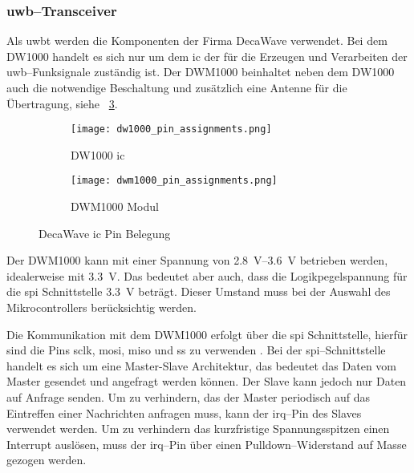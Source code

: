 \begin{comment}
------------------------------------------------------------------------------------------
TODO: Wie wird der Vorwiderstand berechnet? ca. 10mA bei 1.8V, R=(U_0-U_LED)/I_LED

LED Vorwiderstand berechnen
	- https://www.youtube.com/watch?v=iNZj91TSRUg
	- DW1000 Datasheet - 5.9 General Purpose Input Output (GPIO)
\end{comment}
\subsubsection{\gls{uwb}--Transceiver}\label{subsec:uwb_transceiver}

Als \gls{uwbt} werden die Komponenten der Firma DecaWave verwendet. Bei dem DW1000 handelt es sich nur um dem \gls{ic} der für die Erzeugen und Verarbeiten der \gls{uwb}--Funksignale zuständig ist. Der DWM1000 beinhaltet neben dem DW1000 auch die notwendige Beschaltung und zusätzlich eine Antenne für die Übertragung, siehe \figurename~\ref{fig:pin_assignment}.

\begin{figure}
	\begin{subfigure}[t]{0.4\textwidth}
		\texttt{[image: dw1000\_pin\_assignments.png]}
		\caption{DW1000 \gls{ic}}
		\label{fig:dw1000_pin_assignments}
	\end{subfigure}
	\hfill
	\begin{subfigure}[t]{0.4\textwidth}
		\texttt{[image: dwm1000\_pin\_assignments.png]}
		\caption{DWM1000 Modul}
		\label{fig:dwm1000_pin_assignments}
	\end{subfigure}
	\caption{DecaWave \gls{ic} Pin Belegung}
	\label{fig:pin_assignment}
\end{figure}

Der DWM1000 kann mit einer Spannung von \SIrange{2.8}{3.6}{\volt}\cite{decawave2016dwm1kdatasheet} betrieben werden, idealerweise mit \SI{3.3}{\volt}. Das bedeutet aber auch, dass die Logikpegelspannung für die \gls{spi} Schnittstelle \SI{3.3}{\volt} beträgt. Dieser Umstand muss bei der Auswahl des Mikrocontrollers berücksichtig werden.

Die Kommunikation mit dem DWM1000 erfolgt über die \gls{spi} Schnittstelle, hierfür sind die Pins \gls{sclk}, \gls{mosi}, \gls{miso} und \gls{ss} zu verwenden \cite{decawave2016dwm1kdatasheet}. Bei der \gls{spi}--Schnittstelle handelt es sich um eine Master-Slave Architektur, das bedeutet das Daten vom Master gesendet und angefragt werden können. Der Slave kann jedoch nur Daten auf Anfrage senden. Um zu verhindern, das der Master periodisch auf das Eintreffen einer Nachrichten anfragen muss, kann der \gls{irq}--Pin des Slaves verwendet werden. Um zu verhindern das kurzfristige Spannungsspitzen einen Interrupt auslösen, muss der \gls{irq}--Pin über einen Pulldown--Widerstand auf Masse gezogen werden.

